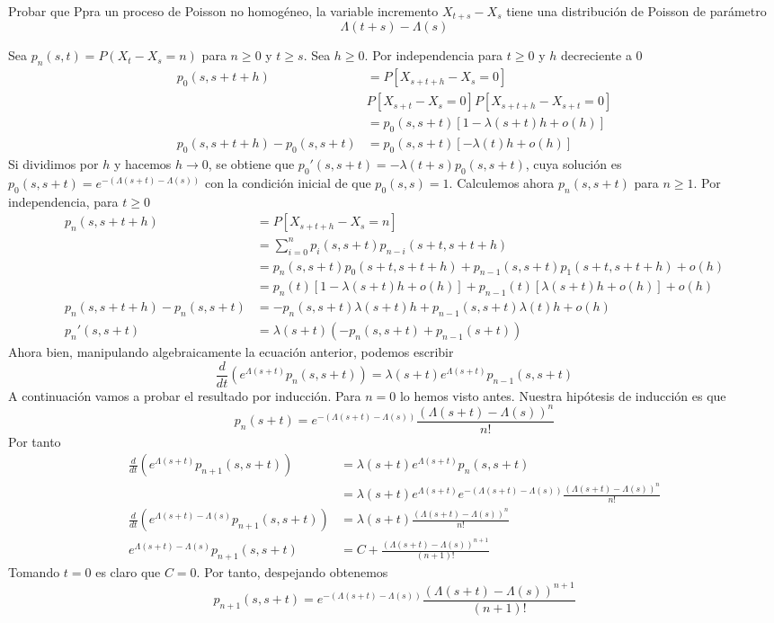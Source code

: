 \documentclass[twoside]{article}
\begin{document}
\begin{ejercicio}{11}
Probar que Ppra un proceso de Poisson no homogéneo, la variable incremento $X_{t+s}-X_{s}$ tiene una distribución de Poisson de parámetro $$\Lambda(t+s)-\Lambda(s)$$	
\end{ejercicio}
\begin{solucion}
Sea $p_{n}(s,t) = P(X_{t}-X_s = n ) $ para $n\geq 0$ y $t\geq s$. Sea $h\geq 0$.  Por independencia para $ t \geq 0$ y $h$ decreciente a 0
\begin{align*}
p_{0}(s,s+t+h)&= P[X_{s+t+h}-X_s = 0]\\
& P[X_{s+t}-X_s = 0]P[X_{s+t+h}-X_{s+t}=0]\\
& = p_{0}(s,s+t)[1- \lambda(s+t)h +o(h)]\\
p_{0}(s,s+t+h)-p_0(s,s+t) &= p_{0}(s,s+t)[-\lambda(t)h + o(h)]
\end{align*}
Si dividimos por $h$ y hacemos $h\to 0$, se obtiene que $p_{0}'(s,s+t) = -\lambda(t+s)p_{0}(s,s+t)$, cuya solución es $p_{0}(s,s+t)=e^{-(\Lambda(s+t)-\Lambda(s))}$ con la condición inicial de que $p_0(s,s)=1$. Calculemos ahora $p_{n}(s,s+t)$ para $n \geq 1$. Por independencia, para $t \geq 0$
\begin{align*}
p_n(s,s+t+h)&=P[X_{s+t+h}-X_s=n]\\
&=\sum_{i=0}^n p_i(s,s+t)p_{n-i}(s+t,s+t+h)\\
&= p_n(s,s+t)p_0(s+t,s+t+h) + p_{n-1}(s,s+t)p_1(s+t,s+t+h)+o(h)\\
&= p_{n}(t) [1- \lambda(s+t)h +o(h)] + p_{n-1}(t)[\lambda(s+t)h+o(h)] + o(h)\\
p_n(s,s+t+h) - p_n(s,s+t) &= -p_n(s,s+t)\lambda(s+t)h+p_{n-1}(s,s+t)\lambda(t)h + o(h)\\
p_n'(s,s+t)&=\lambda(s+t)(-p_n(s,s+t)+p_{n-1}(s+t))
\end{align*}
Ahora bien, manipulando algebraicamente la ecuación anterior, podemos escribir
$$
\frac{d}{dt}\left(e^{\Lambda(s+t)}p_n(s,s+t)\right) = \lambda(s+t)e^{\Lambda(s+t)}p_{n-1}(s,s+t)
$$
A continuación vamos a probar el resultado por inducción. Para $n=0$ lo hemos visto antes. Nuestra hipótesis de inducción es que
$$
p_n(s+t)=e^{-(\Lambda(s+t)-\Lambda(s))}\frac{(\Lambda(s+t)-\Lambda(s))^n}{n!}
$$
Por tanto
\begin{align*}
\frac{d}{dt}\left(e^{\Lambda(s+t)}p_{n+1}(s,s+t)\right) &= \lambda(s+t)e^{\Lambda(s+t)}p_{n}(s,s+t)\\
&= \lambda(s+t)e^{\Lambda(s+t)}e^{-(\Lambda(s+t)-\Lambda(s))}\frac{(\Lambda(s+t)-\Lambda(s))^n}{n!}\\
\frac{d}{dt}\left(e^{\Lambda(s+t)-\Lambda(s)}p_{n+1}(s,s+t)\right) &= \lambda(s+t)\frac{(\Lambda(s+t)-\Lambda(s))^n}{n!}\\
e^{\Lambda(s+t)-\Lambda(s)}p_{n+1}(s,s+t) &= C + \frac{(\Lambda(s+t)-\Lambda(s))^{n+1}}{(n+1)!}
\end{align*}
Tomando $t=0$ es claro que $C=0$. Por tanto, despejando obtenemos
$$
p_{n+1}(s,s+t) = e^{-(\Lambda(s+t)-\Lambda(s))} \frac{(\Lambda(s+t)-\Lambda(s))^{n+1}}{(n+1)!}
$$
\end{solucion}
\newpage
\end{document}
